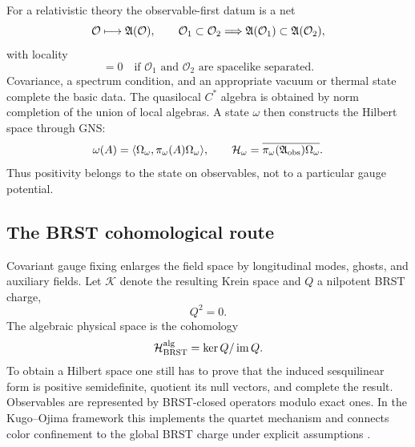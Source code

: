 For a relativistic theory the observable-first datum is a net
\begin{equation}
  \mathcal O\longmapsto\mathfrak{A}(\mathcal O),
  \qquad
  \mathcal O_1\subset\mathcal O_2
  \Longrightarrow
  \mathfrak{A}(\mathcal O_1)\subset\mathfrak{A}(\mathcal O_2),
  \label{eq:aqft-isotony}
\end{equation}
with locality
\begin{equation}
  [A_1,A_2]=0
  \quad\text{if }\mathcal O_1\text{ and }\mathcal O_2
  \text{ are spacelike separated}.
  \label{eq:aqft-locality}
\end{equation}
Covariance, a spectrum condition, and an appropriate vacuum or thermal state
complete the basic data.  The quasilocal $C^*$ algebra is obtained by norm
completion of the union of local algebras.  A state $\omega$ then constructs
the Hilbert space through GNS:
\begin{equation}
  \omega(A)
  =\langle \Omega_\omega,
  \pi_\omega(A)\Omega_\omega\rangle,
  \qquad
  \mathcal{H}_\omega
  =\overline{\pi_\omega(\mathfrak{A}_{\mathrm{obs}})\Omega_\omega}.
  \label{eq:gauge-observable-gns}
\end{equation}
Thus positivity belongs to the state on observables, not to a particular
gauge potential.

\subsection{The BRST cohomological route}

Covariant gauge fixing enlarges the field space by longitudinal modes,
ghosts, and auxiliary fields.  Let $\mathcal K$ denote the resulting Krein
space and $Q$ a nilpotent BRST charge,
\begin{equation}
  Q^2=0.
  \label{eq:brst-nilpotent}
\end{equation}
The algebraic physical space is the cohomology
\begin{equation}
  \mathcal{H}^{\mathrm{alg}}_{\mathrm{BRST}}
  =\ker Q/\operatorname{im}Q.
  \label{eq:brst-cohomology}
\end{equation}
To obtain a Hilbert space one still has to prove that the induced sesquilinear
form is positive semidefinite, quotient its null vectors, and complete the
result.  Observables are represented by BRST-closed operators modulo exact
ones.  In the Kugo--Ojima framework this implements the quartet mechanism and
connects color confinement to the global BRST charge under explicit
assumptions \cite{KugoOjima:1979}.

